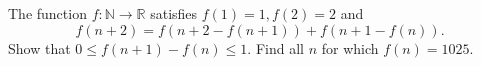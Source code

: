 The function $f : \mathbb N \to \mathbb R$ satisfies $f(1) = 1, f(2) = 2$ and \[f (n+2) = f(n+2 - f(n+1) ) + f(n+1 - f(n) ).\] Show that $0 \leq f(n+1) - f(n) \leq 1$. Find all $n$ for which $f(n) = 1025$.